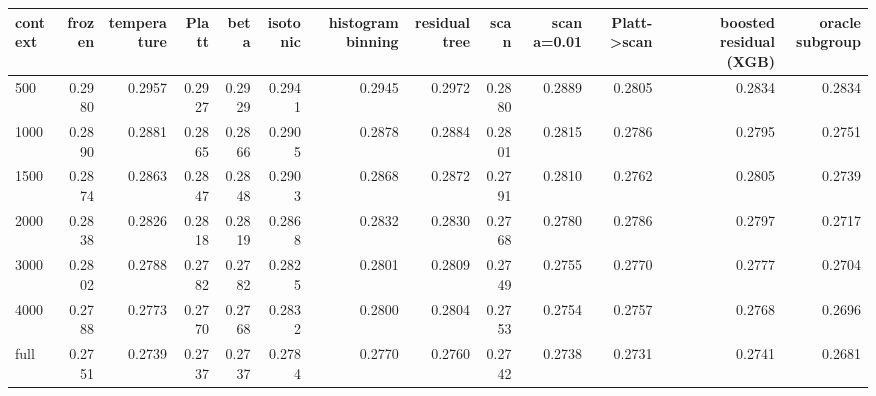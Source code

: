 \begin{tabular}{lrrrrrrrrrrrr}
\toprule
context & frozen & temperature & Platt & beta & isotonic & histogram binning & residual tree & scan & scan a=0.01 & Platt->scan & boosted residual (XGB) & oracle subgroup \\
\midrule
500 & 0.2980 & 0.2957 & 0.2927 & 0.2929 & 0.2941 & 0.2945 & 0.2972 & 0.2880 & 0.2889 & 0.2805 & 0.2834 & 0.2834 \\
1000 & 0.2890 & 0.2881 & 0.2865 & 0.2866 & 0.2905 & 0.2878 & 0.2884 & 0.2801 & 0.2815 & 0.2786 & 0.2795 & 0.2751 \\
1500 & 0.2874 & 0.2863 & 0.2847 & 0.2848 & 0.2903 & 0.2868 & 0.2872 & 0.2791 & 0.2810 & 0.2762 & 0.2805 & 0.2739 \\
2000 & 0.2838 & 0.2826 & 0.2818 & 0.2819 & 0.2868 & 0.2832 & 0.2830 & 0.2768 & 0.2780 & 0.2786 & 0.2797 & 0.2717 \\
3000 & 0.2802 & 0.2788 & 0.2782 & 0.2782 & 0.2825 & 0.2801 & 0.2809 & 0.2749 & 0.2755 & 0.2770 & 0.2777 & 0.2704 \\
4000 & 0.2788 & 0.2773 & 0.2770 & 0.2768 & 0.2832 & 0.2800 & 0.2804 & 0.2753 & 0.2754 & 0.2757 & 0.2768 & 0.2696 \\
full & 0.2751 & 0.2739 & 0.2737 & 0.2737 & 0.2784 & 0.2770 & 0.2760 & 0.2742 & 0.2738 & 0.2731 & 0.2741 & 0.2681 \\
\bottomrule
\end{tabular}

